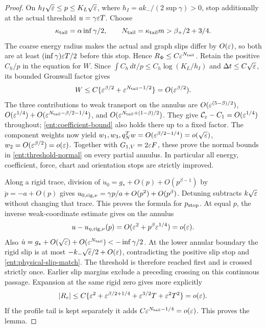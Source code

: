 \begin{proof}
On $h_I\sqrt{\varepsilon}\le p\le K_L\sqrt{\varepsilon}$, where
$h_I=ak_-/(2\sup\gamma)>0$, stop additionally at the actual
threshold $u=\gamma\varepsilon T$. Choose
\begin{equation}
 \kappa_{\rm tail}=\alpha\inf\gamma/2,\qquad
 N_{\rm tail}=\kappa_{\rm tail}m>\beta_+/2+3/4.
 \label{ent:tail-choice}
\end{equation}
The coarse energy radius makes the actual and graph slips differ by
$O(\varepsilon)$, so both are at least $(\inf\gamma)\varepsilon T/2$ before
this stop. Hence $R_\Phi\le C\varepsilon^{N_{\rm tail}}$.
Retain the positive $C_h/p$ in the equation for $W$.
Since $\int C_h\,dt/p\le C_h\log(K_L/h_I)$ and
$\Delta t\le C\sqrt{\varepsilon}$, its bounded Gronwall factor gives
\[
 W\le C\{\varepsilon^{\beta/2}+\varepsilon^{N_{\rm tail}-1/2}\}
       =O(\varepsilon^{\beta/2}).
\]
The three contributions to weak transport on the annulus are
$O(\varepsilon^{(5-\beta)/2})$,
$O(\varepsilon^{1/4})+O(\varepsilon^{N_{\rm tail}-\beta/2-1/4})$, and
$O(\varepsilon^{N_{\rm tail}+(1-\beta)/2})$.
They give $\mathcal C_\varepsilon-C_1=O(\varepsilon^{1/4})$ throughout;
\eqref{ent:coefficient-bound} also holds there up to a fixed factor.
The component weights now yield
$w_1,w_3,q_N^Tw=O(\varepsilon^{\beta/2-1/4})=o(\sqrt{\varepsilon})$,
$w_2=O(\varepsilon^{\beta/2})=o(\varepsilon)$.
Together with $G_{1,V}=2\varepsilon F$, these prove the normal bounds
in \eqref{ent:threshold-normal} on every partial annulus.
In particular all energy, coefficient, force, chart and orientation
stops are strictly improved.

Along a rigid trace, division of
$\dot u_0=g_*+O(p)+O(p^{\beta-1})$ by
$\dot p=-a+O(p)$ gives
$u_{0,{\rm rig},\nu}=\gamma p/a+O(p^2)+O(p^\beta)$.
Detuning subtracts $k\sqrt{\varepsilon}$ without changing that trace.
This proves the formula for $p_{\rm stop}$. At equal $p$, the
inverse weak-coordinate estimate gives on the annulus
\begin{equation}
 u-u_{\eta,{\rm rig},\nu}(p)
 =O(\varepsilon^2+p^\beta\varepsilon^{1/4})=o(\varepsilon).
 \label{ent:physical-slip-match}
\end{equation}
Also $\dot u=g_*+O(\sqrt{\varepsilon})+O(\varepsilon^{N_{\rm tail}})
<-\inf\gamma/2$. At the lower annular boundary the rigid slip
is at most $-k_-\sqrt{\varepsilon}/2+O(\varepsilon)$, contradicting the positive
slip stop and \eqref{ent:physical-slip-match}. The threshold is
therefore reached first and is crossed strictly once. Earlier slip
margins exclude a preceding crossing on this continuous passage.
Expansion at the same rigid zero gives more explicitly
\begin{equation}
 |R_e|\le C\{\varepsilon^2+\varepsilon^{\beta/2+1/4}
                  +\varepsilon^{3/2}T+\varepsilon^2T^2\}=o(\varepsilon).
 \label{ent:threshold-remainder}
\end{equation}
If the profile tail is kept separately it adds
$C\varepsilon^{N_{\rm tail}-1/4}=o(\varepsilon)$. This proves the lemma.
\end{proof}


